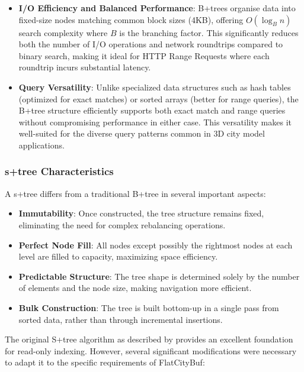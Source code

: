 \begin{itemize}
    \item \textbf{I/O Efficiency and Balanced Performance}: B+trees organise data into fixed-size nodes matching common block sizes (4KB), offering $O(\log_B n)$ search complexity where $B$ is the branching factor. This significantly reduces both the number of I/O operations and network roundtrips compared to binary search, making it ideal for HTTP Range Requests where each roundtrip incurs substantial latency.

    \item \textbf{Query Versatility}: Unlike specialized data structures such as hash tables (optimized for exact matches) or sorted arrays (better for range queries), the B+tree structure efficiently supports both exact match and range queries without compromising performance in either case. This versatility makes it well-suited for the diverse query patterns common in 3D city model applications.
\end{itemize}

\subsubsection{\ac{s+tree} Characteristics}
\label{methodology:attribute_index:static_btree_characteristics}

A \ac{s+tree} differs from a traditional B+tree in several important aspects:

\begin{itemize}
    \item \textbf{Immutability}: Once constructed, the tree structure remains fixed, eliminating the need for complex rebalancing operations.

    \item \textbf{Perfect Node Fill}: All nodes except possibly the rightmost nodes at each level are filled to capacity, maximizing space efficiency.

    \item \textbf{Predictable Structure}: The tree shape is determined solely by the number of elements and the node size, making navigation more efficient.

    \item \textbf{Bulk Construction}: The tree is built bottom-up in a single pass from sorted data, rather than through incremental insertions.
\end{itemize}

The original S+tree algorithm as described by \citet{static_b_trees} provides an excellent foundation for read-only indexing. However, several significant modifications were necessary to adapt it to the specific requirements of FlatCityBuf:

